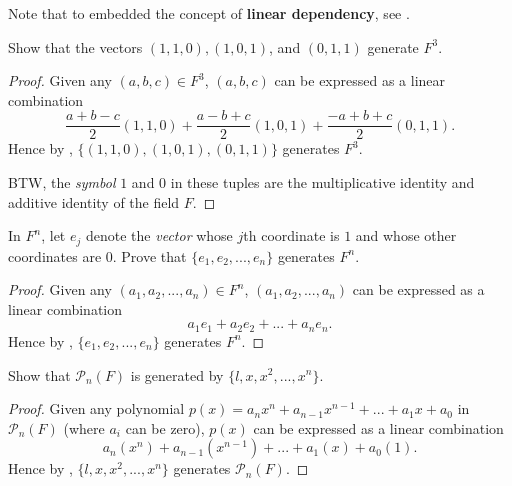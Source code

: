 \begin{note}
Note that  to  embedded the concept of \textbf{linear dependency}, see .
\end{note}

\begin{exercise} \label{exercise 1.4.6}
Show that the vectors \((1, 1, 0), (1, 0, 1)\), and \((0, 1, 1)\) generate \(F^3\).
\end{exercise}

\begin{proof}
Given any \((a, b, c) \in F^3\), \((a, b, c)\) can be expressed as a linear combination
\[
    \frac{a + b - c}{2} (1, 1, 0) + \frac{a - b + c}{2} (1, 0, 1) + \frac{-a + b + c}{2} (0, 1, 1).
\]
Hence by , \(\{(1, 1, 0), (1, 0, 1), (0, 1, 1)\}\) generates \(F^3\).

BTW, the \emph{symbol} \(1\) and \(0\) in these tuples are the multiplicative identity and additive identity of the field \(F\).
\end{proof}

\begin{exercise} \label{exercise 1.4.7}
In \(F^n\), let \(e_j\) denote the \emph{vector} whose \(j\)th coordinate is \(1\) and whose other coordinates are \(0\).
Prove that \(\{ e_1, e_2, ..., e_n \}\) generates \(F^n\).
\end{exercise}

\begin{proof}
Given any \((a_1, a_2, ..., a_n) \in F^n\), \((a_1, a_2, ..., a_n)\) can be expressed as a linear combination
\[
    a_1 e_1 + a_2 e_2 + ... + a_n e_n.
\]
Hence by , \(\{ e_1, e_2, ..., e_n \}\) generates \(F^n\).
\end{proof}

\begin{exercise} \label{exercise 1.4.8}
Show that \(\mathcal{P}_n(F)\) is generated by \(\{ l, x, x^2, ..., x^n\}\).
\end{exercise}

\begin{proof}
Given any polynomial \(p(x) = a_n x^n + a_{n - 1} x^{n - 1} + ... + a_1 x + a_0\) in \(\mathcal{P}_n(F)\) (where \(a_i\) can be zero), \(p(x)\) can be expressed as a linear combination
\[
    a_n (x^n) + a_{n - 1} (x^{n - 1}) + ... + a_1 (x) + a_0 (1).
\]
Hence by , \(\{ l, x, x^2, ..., x^n\}\) generates \(\mathcal{P}_n(F)\).
\end{proof}

